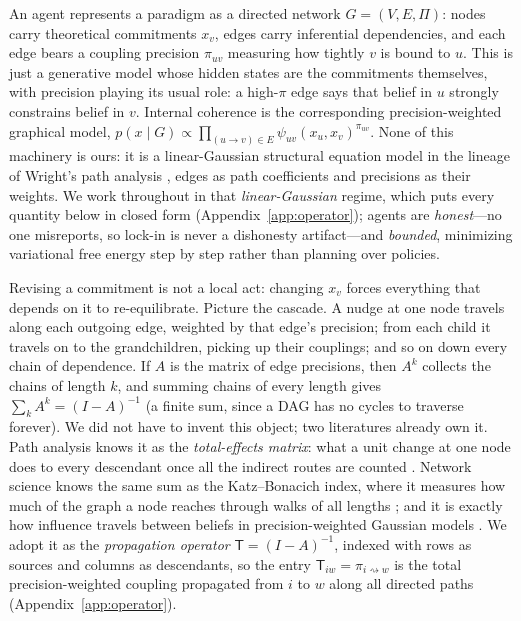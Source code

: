 \documentclass[11pt]{article}
\newcommand{\rw}{\rightsquigarrow}
\newcommand{\Top}{\mathsf{T}}          %
\begin{document}
An agent represents a paradigm as a directed network $G=(V,E,\Pi)$: nodes carry theoretical
commitments $x_v$, edges carry inferential dependencies, and each edge bears a coupling precision
$\pi_{uv}$ measuring how tightly $v$ is bound to $u$. This is just a generative model whose hidden
states are the commitments themselves, with precision playing its usual role: a high-$\pi$ edge says
that belief in $u$ strongly constrains belief in $v$. Internal coherence is the corresponding
precision-weighted graphical model, $p(x\mid G)\propto\prod_{(u\to v)\in
E}\psi_{uv}(x_u,x_v)^{\pi_{uv}}$. None of this machinery is ours: it is a linear-Gaussian structural
equation model in the lineage of Wright's path analysis \citep{wright1934}, edges as path
coefficients and precisions as their weights. We work
throughout in that \emph{linear-Gaussian} regime, which puts every quantity below in closed form
(Appendix~\ref{app:operator}); agents are \emph{honest}---no one misreports, so lock-in is never a
dishonesty artifact---and \emph{bounded}, minimizing variational free energy step by step
\citep{dacosta2020} rather than planning over policies.

Revising a commitment is not a local act: changing $x_v$ forces everything that depends on it to
re-equilibrate. Picture the cascade. A nudge at one node travels along each outgoing edge, weighted
by that edge's precision; from each child it travels on to the grandchildren, picking up their
couplings; and so on down every chain of dependence. If $A$ is the matrix of edge precisions, then
$A^k$ collects the chains of length $k$, and summing chains of every length gives
$\sum_k A^k=(I-A)^{-1}$ (a finite sum, since a DAG has no cycles to traverse forever). We did not
have to invent this object; two literatures already own it. Path analysis knows it as the
\emph{total-effects matrix}: what a unit change at one node does to every descendant once all the
indirect routes are counted \citep{wright1934,bollen1987}. Network science knows the same sum as
the Katz--Bonacich index, where it measures how much of the graph a node reaches through walks of
all lengths \citep{katz1953,bonacich1987}; and it is exactly how influence travels between beliefs
in precision-weighted Gaussian models \citep{malioutov2006}. We adopt it as the \emph{propagation
operator} $\Top=(I-A)^{-1}$, indexed with rows as sources and columns as descendants, so the entry
$\Top_{iw}=\pi_{i\rw w}$ is the total precision-weighted coupling propagated from $i$ to $w$ along
all directed paths (Appendix~\ref{app:operator}).
\end{document}
